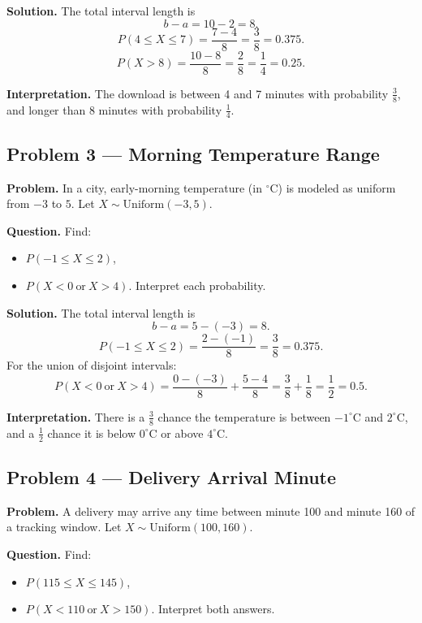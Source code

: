 \begin{ExamProblems}
\textbf{Solution.}
The total interval length is
\[
b-a=10-2=8.
\]
\[
P(4\le X\le 7)=\frac{7-4}{8}=\frac{3}{8}=0.375.
\]
\[
P(X>8)=\frac{10-8}{8}=\frac{2}{8}=\frac{1}{4}=0.25.
\]

\textbf{Interpretation.}
The download is between 4 and 7 minutes with probability $\frac{3}{8}$, and longer than 8 minutes with probability $\frac{1}{4}$.


\item
\subsection*{Problem 3 — Morning Temperature Range}

\textbf{Problem.}
In a city, early-morning temperature (in $^\circ$C) is modeled as uniform from $-3$ to $5$.
Let $X\sim \text{Uniform}(-3,5)$.

\textbf{Question.}
Find:
\begin{itemize}
    \item[(a)] $P(-1\le X\le 2)$,
    \item[(b)] $P(X<0\ \text{or}\ X>4)$.
Interpret each probability.
\end{itemize}

\textbf{Solution.}
The total interval length is
\[
b-a=5-(-3)=8.
\]
\[
P(-1\le X\le 2)=\frac{2-(-1)}{8}=\frac{3}{8}=0.375.
\]
For the union of disjoint intervals:
\[
P(X<0\ \text{or}\ X>4)=\frac{0-(-3)}{8}+\frac{5-4}{8}=\frac{3}{8}+\frac{1}{8}=\frac{1}{2}=0.5.
\]

\textbf{Interpretation.}
There is a $\frac{3}{8}$ chance the temperature is between $-1^\circ$C and $2^\circ$C, and a $\frac{1}{2}$ chance it is below $0^\circ$C or above $4^\circ$C.


\item
\subsection*{Problem 4 — Delivery Arrival Minute}

\textbf{Problem.}
A delivery may arrive any time between minute 100 and minute 160 of a tracking window.
Let $X\sim \text{Uniform}(100,160)$.

\textbf{Question.}
Find:
\begin{itemize}
    \item[(a)] $P(115\le X\le 145)$,
    \item[(b)] $P(X<110\ \text{or}\ X>150)$.
Interpret both answers.
\end{itemize}


\end{ExamProblems}
